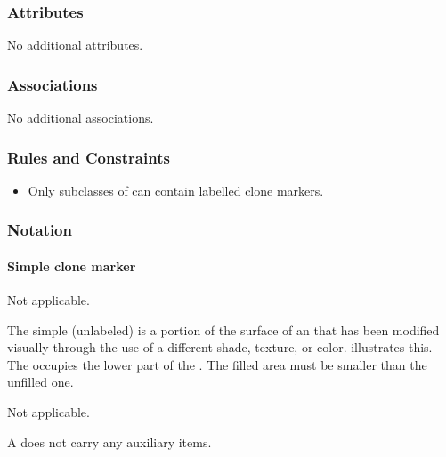 \subsubsection{Attributes}

No additional attributes.

\subsubsection{Associations}

No additional associations.

\subsubsection{Rules and Constraints}

\begin{itemize}
\item Only subclasses of  can contain
labelled clone markers.
\end{itemize}

\subsubsection{Notation}

\paragraph{Simple clone marker}

\begin{glyphDescription}

\glyphSboTerm Not applicable.

\glyphContainer The simple (unlabeled)  is a
portion of the surface of an  that has been modified
visually through the use of a different shade, texture, or color.
 illustrates this.  The 
occupies the lower part of the . The filled area must be
smaller than the unfilled one.

\glyphLabel Not applicable.

\glyphAux A  does not carry any auxiliary items.

\end{glyphDescription}

